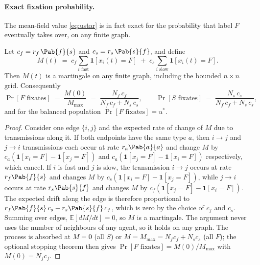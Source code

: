 \paragraph{Exact fixation probability.} The mean-field value \eqref{eq:ustar} is in fact exact for the probability that label $F$ eventually takes over, on any finite graph.

\begin{proposition}
\label{prop:fixation}
Let $c_f = r_f\, \Pab{f}{s}$ and $c_s = r_s\, \Pab{s}{f}$, and define
\[
M(t) \;=\; c_f \sum_{i \text{ fast}} \mathbf{1}[x_i(t) = F] \;+\; c_s \sum_{i \text{ slow}} \mathbf{1}[x_i(t) = F].
\]
Then $M(t)$ is a martingale on any finite graph, including the bounded $n \times n$ grid. Consequently
\begin{equation}
\Pr[F \text{ fixates}] \;=\; \frac{M(0)}{M_{\max}} \;=\; \frac{N_f\, c_f}{N_f\, c_f + N_s\, c_s}, \qquad
\Pr[S \text{ fixates}] \;=\; \frac{N_s\, c_s}{N_f\, c_f + N_s\, c_s},
\label{eq:fixation}
\end{equation}
and for the balanced population $\Pr[F \text{ fixates}] = u^\ast$.
\end{proposition}

\begin{proof}
Consider one edge $\{i, j\}$ and the expected rate of change of $M$ due to transmissions along it. If both endpoints have the same type $a$, then $i \to j$ and $j \to i$ transmissions each occur at rate $r_a \Pab{a}{a}$ and change $M$ by $c_a(\mathbf{1}[x_i = F] - \mathbf{1}[x_j = F])$ and $c_a(\mathbf{1}[x_j = F] - \mathbf{1}[x_i = F])$ respectively, which cancel. If $i$ is fast and $j$ is slow, the transmission $i \to j$ occurs at rate $r_f \Pab{f}{s}$ and changes $M$ by $c_s(\mathbf{1}[x_i = F] - \mathbf{1}[x_j = F])$, while $j \to i$ occurs at rate $r_s \Pab{s}{f}$ and changes $M$ by $c_f(\mathbf{1}[x_j = F] - \mathbf{1}[x_i = F])$. The expected drift along the edge is therefore proportional to $r_f \Pab{f}{s}\, c_s - r_s \Pab{s}{f}\, c_f$, which is zero by the choice of $c_f$ and $c_s$. Summing over edges, $\mathbb{E}[dM/dt] = 0$, so $M$ is a martingale. The argument never uses the number of neighbours of any agent, so it holds on any graph. The process is absorbed at $M = 0$ (all $S$) or $M = M_{\max} = N_f c_f + N_s c_s$ (all $F$); the optional stopping theorem then gives $\Pr[F \text{ fixates}] = M(0)/M_{\max}$ with $M(0) = N_f c_f$.
\end{proof}


